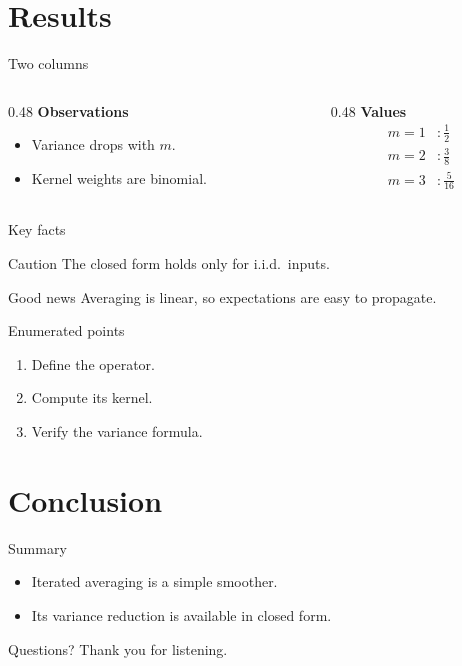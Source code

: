 \documentclass[aspectratio=169]{beamer}
\begin{document}
\section{Results}

\begin{frame}{Two columns}
  \begin{columns}[T]
    \begin{column}{0.48\textwidth}
      \textbf{Observations}
      \begin{itemize}
        \item Variance drops with $m$.
        \item Kernel weights are binomial.
      \end{itemize}
    \end{column}
    \begin{column}{0.48\textwidth}
      \textbf{Values}
      \begin{align*}
        m=1 &: \tfrac12 \\
        m=2 &: \tfrac38 \\
        m=3 &: \tfrac{5}{16}
      \end{align*}
    \end{column}
  \end{columns}
\end{frame}

\begin{frame}{Key facts}
  \begin{alertblock}{Caution}
    The closed form holds only for i.i.d.\ inputs.
  \end{alertblock}
  \begin{exampleblock}{Good news}
    Averaging is linear, so expectations are easy to propagate.
  \end{exampleblock}
\end{frame}

\begin{frame}{Enumerated points}
  \begin{enumerate}
    \item<1-> Define the operator.
    \item<2-> Compute its kernel.
    \item<3-> Verify the variance formula.
  \end{enumerate}
\end{frame}

\section{Conclusion}

\begin{frame}{Summary}
  \begin{itemize}
    \item Iterated averaging is a simple smoother.
    \item Its variance reduction is available in closed form.
  \end{itemize}
\end{frame}

\begin{frame}{Questions?}
  \centering
  Thank you for listening.
\end{frame}
\end{document}
